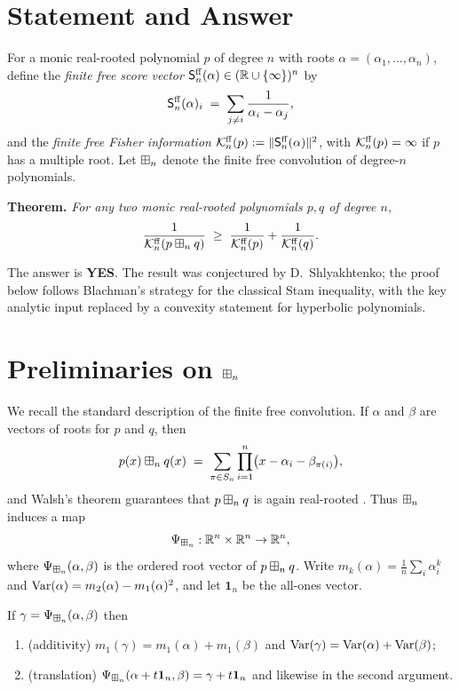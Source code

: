 \documentclass[11pt]{article}
\begin{document}
\section*{Statement and Answer}

For a monic real-rooted polynomial $p$ of degree $n$ with roots
$\alpha=(\alpha_1,\dots,\alpha_n)$, define the \emph{finite free score vector}
$\mathsf{S}^{\mathrm{ff}}_n(\alpha)\in(\mathbb{R}\cup\{\infty\})^n$ by
\[
\mathsf{S}^{\mathrm{ff}}_n(\alpha)_i \;=\; \sum_{j\ne i}\frac{1}{\alpha_i-\alpha_j},
\]
and the \emph{finite free Fisher information}
$\mathcal{K}^{\mathrm{ff}}_n(p):=\|\mathsf{S}^{\mathrm{ff}}_n(\alpha)\|^2$, with $\mathcal{K}^{\mathrm{ff}}_n(p)=\infty$ if $p$ has a
multiple root. Let $\boxplus_n$ denote the finite free convolution of degree-$n$
polynomials.

\medskip
\noindent\textbf{Theorem.} \emph{For any two monic real-rooted polynomials
$p,q$ of degree $n$,}
\[
\frac{1}{\mathcal{K}^{\mathrm{ff}}_n(p\boxplus_n q)}\;\ge\;\frac{1}{\mathcal{K}^{\mathrm{ff}}_n(p)}+\frac{1}{\mathcal{K}^{\mathrm{ff}}_n(q)}.
\]

\medskip
\noindent The answer is \textbf{YES}. The result was conjectured by
D.~Shlyakhtenko; the proof below follows Blachman's strategy for the classical
Stam inequality, with the key analytic input replaced by a convexity statement
for hyperbolic polynomials.

\section*{Preliminaries on $\boxplus_n$}

We recall the standard description of the finite free convolution. If $\alpha$
and $\beta$ are vectors of roots for $p$ and $q$, then
\begin{equation}\label{eq:walsh}
p(x)\boxplus_n q(x)\;=\;\sum_{\pi\in S_n}\prod_{i=1}^n\bigl(x-\alpha_i-\beta_{\pi(i)}\bigr),
\end{equation}
and Walsh's theorem guarantees that $p\boxplus_n q$ is again real-rooted
\cite{Walsh, MSS22}. Thus $\boxplus_n$ induces a map
\[
\Psi_{\boxplus_n}:\mathbb{R}^n\times\mathbb{R}^n\to\mathbb{R}^n,
\]
where $\Psi_{\boxplus_n}(\alpha,\beta)$ is the ordered root vector of $p\boxplus_n q$. Write
$m_k(\alpha)=\frac1n\sum_i\alpha_i^k$ and
$\operatorname{Var}(\alpha)=m_2(\alpha)-m_1(\alpha)^2$, and let $\mathbf 1_n$ be the all-ones
vector.

\begin{qfourproposition}\label{prop:props}
If $\gamma=\Psi_{\boxplus_n}(\alpha,\beta)$ then
\begin{enumerate}\setlength\itemsep{2pt}
\item (additivity) $m_1(\gamma)=m_1(\alpha)+m_1(\beta)$ and
$\operatorname{Var}(\gamma)=\operatorname{Var}(\alpha)+\operatorname{Var}(\beta)$;
\item (translation) $\Psi_{\boxplus_n}(\alpha+t\mathbf 1_n,\beta)=\gamma+t\mathbf 1_n$
and likewise in the second argument.
\end{enumerate}
\end{qfourproposition}
\end{document}
